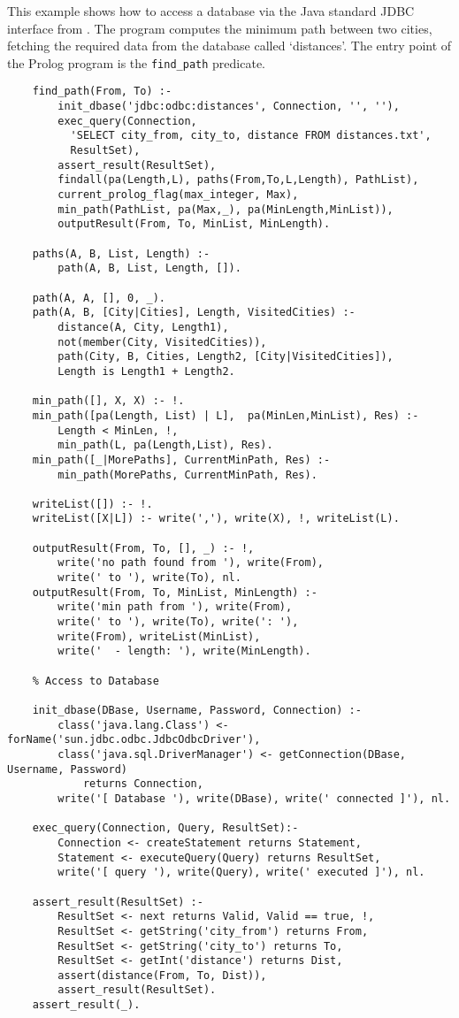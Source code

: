 This example shows how to access a database via the Java standard
JDBC interface from \tuprolog{}.
%
The program computes the minimum path between two cities, fetching
the required data from the database called `distances'.
%
The entry point of the Prolog program is the \texttt{find\_path}
predicate.
%
{\small%
\begin{verbatim}
    find_path(From, To) :-
        init_dbase('jdbc:odbc:distances', Connection, '', ''),
        exec_query(Connection,
          'SELECT city_from, city_to, distance FROM distances.txt',
          ResultSet),
        assert_result(ResultSet),
        findall(pa(Length,L), paths(From,To,L,Length), PathList),
        current_prolog_flag(max_integer, Max),
        min_path(PathList, pa(Max,_), pa(MinLength,MinList)),
        outputResult(From, To, MinList, MinLength).

    paths(A, B, List, Length) :-
        path(A, B, List, Length, []).

    path(A, A, [], 0, _).
    path(A, B, [City|Cities], Length, VisitedCities) :-
        distance(A, City, Length1),
        not(member(City, VisitedCities)),
        path(City, B, Cities, Length2, [City|VisitedCities]),
        Length is Length1 + Length2.

    min_path([], X, X) :- !.
    min_path([pa(Length, List) | L],  pa(MinLen,MinList), Res) :-
        Length < MinLen, !,
        min_path(L, pa(Length,List), Res).
    min_path([_|MorePaths], CurrentMinPath, Res) :-
        min_path(MorePaths, CurrentMinPath, Res).

    writeList([]) :- !.
    writeList([X|L]) :- write(','), write(X), !, writeList(L).

    outputResult(From, To, [], _) :- !,
        write('no path found from '), write(From),
        write(' to '), write(To), nl.
    outputResult(From, To, MinList, MinLength) :-
        write('min path from '), write(From),
        write(' to '), write(To), write(': '),
        write(From), writeList(MinList),
        write('  - length: '), write(MinLength).

    % Access to Database

    init_dbase(DBase, Username, Password, Connection) :-
        class('java.lang.Class') <- forName('sun.jdbc.odbc.JdbcOdbcDriver'),
        class('java.sql.DriverManager') <- getConnection(DBase, Username, Password)
            returns Connection,
        write('[ Database '), write(DBase), write(' connected ]'), nl.

    exec_query(Connection, Query, ResultSet):-
        Connection <- createStatement returns Statement,
        Statement <- executeQuery(Query) returns ResultSet,
        write('[ query '), write(Query), write(' executed ]'), nl.

    assert_result(ResultSet) :-
        ResultSet <- next returns Valid, Valid == true, !,
        ResultSet <- getString('city_from') returns From,
        ResultSet <- getString('city_to') returns To,
        ResultSet <- getInt('distance') returns Dist,
        assert(distance(From, To, Dist)),
        assert_result(ResultSet).
    assert_result(_).
\end{verbatim}
}

